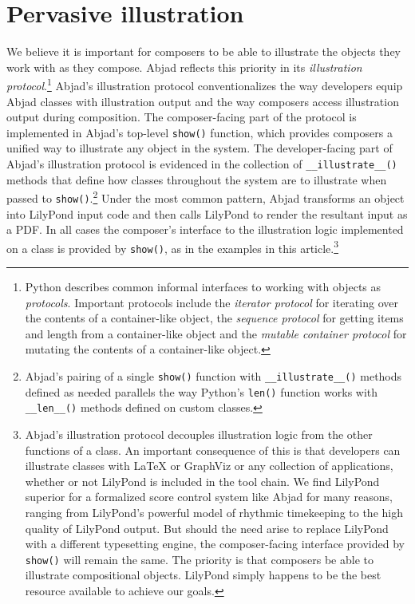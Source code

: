 \documentclass{article}
\begin{document}
\section{Pervasive illustration} \label{sec:illustration}

We believe it is important for composers to be able to illustrate the objects
they work with as they compose. Abjad reflects this priority in its
\emph{illustration protocol}.\footnote{Python describes common informal
interfaces to working with objects as \emph{protocols}. Important protocols
include the \emph{iterator protocol} for iterating over the contents of a
container-like object, the \emph{sequence protocol} for getting items and
length from a container-like object and the \emph{mutable container protocol}
for mutating the contents of a container-like object.} Abjad's illustration
protocol conventionalizes the way developers equip Abjad classes with
illustration output and the way composers access illustration output during
composition. The composer-facing part of the protocol is implemented in Abjad's
top-level \texttt{show()} function, which provides composers a unified way to
illustrate any object in the system. The developer-facing part of Abjad's
illustration protocol is evidenced in the collection of
\texttt{\_\_illustrate\_\_()} methods that define how classes throughout the
system are to illustrate when passed to \texttt{show()}.\footnote{Abjad's
pairing of a single \texttt{show()} function with \texttt{\_\_illustrate\_\_()}
methods defined as needed parallels the way Python's \texttt{len()} function
works with \texttt{\_\_len\_\_()} methods defined on custom classes.} Under the
most common pattern, Abjad transforms an object into LilyPond input code and
then calls LilyPond to render the resultant input as a PDF. In all cases the
composer's interface to the illustration logic implemented on a  class is
provided by \texttt{show()}, as in the examples in this
article.\footnote{Abjad's illustration protocol decouples illustration logic
from the other functions of a class. An important consequence of this is that
developers can illustrate classes with LaTeX or GraphViz or any collection of
applications, whether or not LilyPond is included in the tool chain. We find
LilyPond superior for a formalized score control system like Abjad for many
reasons, ranging from LilyPond's powerful model of rhythmic timekeeping to the
high quality of LilyPond output. But should the need arise to replace LilyPond
with a different typesetting engine, the composer-facing  interface provided by
\texttt{show()} will remain the same. The priority is that composers be able to
illustrate compositional objects. LilyPond simply happens to be the best
resource available to achieve our goals.}
\end{document}
